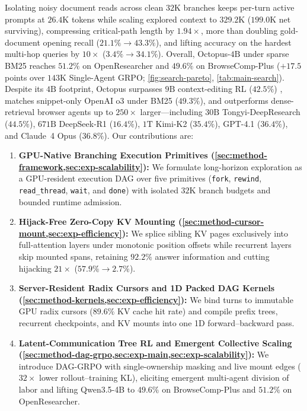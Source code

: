 \documentclass{article}
\begin{document}
Isolating noisy document reads across clean $32\text{K}$ branches keeps per-turn active prompts at $26.4\text{K}$ tokens while scaling explored context to $329.2\text{K}$ ($199.0\text{K}$ net surviving), compressing critical-path length by $1.94\times$, more than doubling gold-document opening recall ($21.1\% \to 43.3\%$), and lifting accuracy on the hardest multi-hop queries by $10\times$ ($3.4\% \to 34.1\%$). Overall, Octopus-$4\text{B}$ under sparse BM25 reaches $51.2\%$ on OpenResearcher and $49.6\%$ on BrowseComp-Plus ($+17.5$ points over $143\text{K}$ Single-Agent GRPO; \cref{fig:search-pareto}, \cref{tab:main-search}). Despite its $4\text{B}$ footprint, Octopus surpasses $9\text{B}$ context-editing RL ($42.5\%$) \citep{shao2026clm}, matches snippet-only OpenAI o3 under BM25 ($49.3\%$), and outperforms dense-retrieval browser agents up to $250\times$ larger---including $30\text{B}$ Tongyi-DeepResearch ($44.5\%$), $671\text{B}$ DeepSeek-R1 ($16.4\%$), $1\text{T}$ Kimi-K2 ($35.4\%$), GPT-4.1 ($36.4\%$), and Claude~4 Opus ($36.8\%$). Our contributions are:
\begin{enumerate}[leftmargin=15pt, itemsep=1.2pt, topsep=1.5pt, parsep=0pt]
  \item \textbf{GPU-Native Branching Execution Primitives (\cref{sec:method-framework,sec:exp-scalability}):} We formulate long-horizon exploration as a GPU-resident execution DAG over five primitives (\texttt{fork}, \texttt{rewind}, \texttt{read\_thread}, \texttt{wait}, and \texttt{done}) with isolated $32\text{K}$ branch budgets and bounded runtime admission.
  \item \textbf{Hijack-Free Zero-Copy KV Mounting (\cref{sec:method-cursor-mount,sec:exp-efficiency}):} We splice sibling KV pages exclusively into full-attention layers under monotonic position offsets while recurrent layers skip mounted spans, retaining $92.2\%$ answer information and cutting hijacking $21\times$ ($57.9\% \to 2.7\%$).
  \item \textbf{Server-Resident Radix Cursors and 1D Packed DAG Kernels (\cref{sec:method-kernels,sec:exp-efficiency}):} We bind turns to immutable GPU radix cursors ($89.6\%$ KV cache hit rate) and compile prefix trees, recurrent checkpoints, and KV mounts into one 1D forward--backward pass.
  \item \textbf{Latent-Communication Tree RL and Emergent Collective Scaling (\cref{sec:method-dag-grpo,sec:exp-main,sec:exp-scalability}):} We introduce DAG-GRPO with single-ownership masking and live mount edges ($32\times$ lower rollout--training KL), eliciting emergent multi-agent division of labor and lifting Qwen3.5-4B to $49.6\%$ on BrowseComp-Plus and $51.2\%$ on OpenResearcher.
\end{enumerate}
\end{document}
